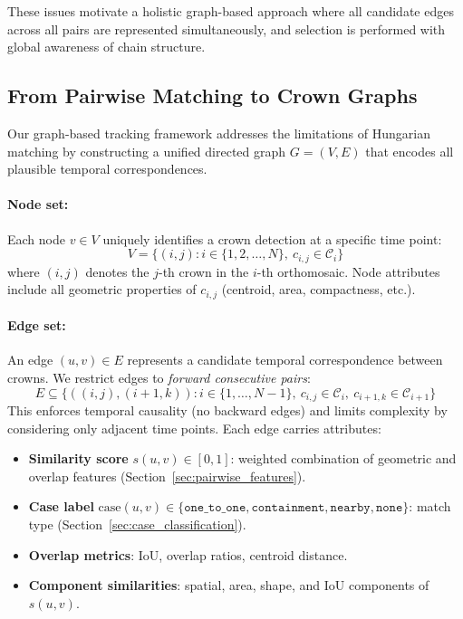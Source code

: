These issues motivate a holistic graph-based approach where all candidate edges across all pairs are represented simultaneously, and selection is performed with global awareness of chain structure.

\subsection{From Pairwise Matching to Crown Graphs}

Our graph-based tracking framework addresses the limitations of Hungarian matching by constructing a unified directed graph $G = (V, E)$ that encodes all plausible temporal correspondences.

\paragraph{Node set:} Each node $v \in V$ uniquely identifies a crown detection at a specific time point:
\[
V = \{(i, j) : i \in \{1, 2, \ldots, N\}, \ c_{i,j} \in \mathcal{C}_i\}
\]
where $(i,j)$ denotes the $j$-th crown in the $i$-th orthomosaic. Node attributes include all geometric properties of $c_{i,j}$ (centroid, area, compactness, etc.).

\paragraph{Edge set:} An edge $(u, v) \in E$ represents a candidate temporal correspondence between crowns. We restrict edges to \emph{forward consecutive pairs}:
\[
E \subseteq \{((i,j), (i+1,k)) : i \in \{1, \ldots, N-1\}, \ c_{i,j} \in \mathcal{C}_i, \ c_{i+1,k} \in \mathcal{C}_{i+1}\}
\]
This enforces temporal causality (no backward edges) and limits complexity by considering only adjacent time points. Each edge carries attributes:
\begin{itemize}
    \item \textbf{Similarity score} $s(u,v) \in [0,1]$: weighted combination of geometric and overlap features (Section~\ref{sec:pairwise_features}).
    \item \textbf{Case label} $\text{case}(u,v) \in \{\texttt{one\_to\_one}, \texttt{containment}, \texttt{nearby}, \texttt{none}\}$: match type (Section~\ref{sec:case_classification}).
    \item \textbf{Overlap metrics}: IoU, overlap ratios, centroid distance.
    \item \textbf{Component similarities}: spatial, area, shape, and IoU components of $s(u,v)$.
\end{itemize}

